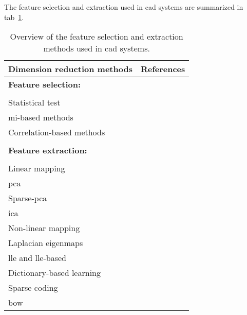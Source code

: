 The feature selection and extraction used in \ac{cad} systems are summarized in
\acs{tab}~\ref{tab:featext}.

\begin{table}
  \caption{Overview of the feature selection and extraction methods used in \acs*{cad} systems.}
  \centering
  \begin{tabular}{l r}
    \toprule
    \textbf{Dimension reduction methods} & \textbf{References} \\
    \midrule
    \textbf{Feature selection:} & \\ \\ [-1.5ex]
    \quad Statistical test & \cite{Niaf2011,Niaf2012,Vos2012,Lemaitre2016thesis} \\
    \quad \ac{mi}-based methods & \cite{Niaf2011,Niaf2012,Vos2008,lehaire2014computer,khalvati2015automated,chung2015prostate,Lemaitre2016thesis} \\
    \quad Correlation-based methods & \cite{rampun2016computer,rampun2015computer} \\ \\ [-1.5ex]
    \textbf{Feature extraction:} & \\ \\ [-1.5ex]
    \quad Linear mapping & \\
    \quad \quad \acs*{pca} & \cite{Tiwari2008,Tiwari2009} \\
    \quad \quad Sparse-\acs*{pca} & \cite{Lemaitre2016thesis} \\
    \quad \quad \acs*{ica} & \cite{Lemaitre2016thesis} \\
    \quad Non-linear mapping & \\
    \quad \quad Laplacian eigenmaps & \cite{Tiwari2007,Tiwari2009a,Tiwari2009,Tiwari2010,Viswanath2008,Viswanath2011} \\
    \quad \quad \acs*{lle} and \acs*{lle}-based & \cite{Tiwari2008,Tiwari2009,Viswanath2008a,Viswanath2008} \\
    \quad Dictionary-based learning & \\
    \quad \quad Sparse coding & \cite{lehaire2014computer} \\
    \quad \quad \acs*{bow} & \cite{rampun2016computerb,rampun2015classifying} \\
    \bottomrule
  \end{tabular}
  \label{tab:featext}
\end{table}
